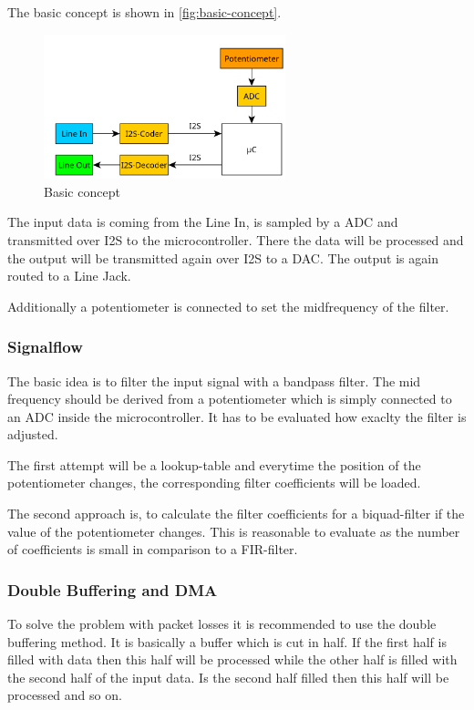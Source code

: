 The basic concept is shown in \autoref{fig:basic-concept}.

\begin{figure}[!h]
    \centering
    \includegraphics[width=7cm]{img/basic_concept.PNG}
    \caption{Basic concept}
    \label{fig:basic-concept}
\end{figure}

The input data is coming from the Line In, is sampled by a \ac{ADC} and transmitted
over \ac{I2S} to the microcontroller. There the data will be processed and the output will be transmitted
again over \ac{I2S} to a \ac{DAC}. The output is again routed to a Line Jack.

Additionally a potentiometer is connected to set the midfrequency of the filter.

\subsubsection{Signalflow}

The basic idea is to filter the input signal with a bandpass filter. The mid frequency should be derived
from a potentiometer which is simply connected to an \ac{ADC} inside the microcontroller. It has to be evaluated
how exaclty the filter is adjusted.

The first attempt will be a lookup-table and everytime the position of the
potentiometer changes, the corresponding filter coefficients will be loaded.

The second approach is, to calculate the filter coefficients for a biquad-filter if the value of the potentiometer changes.
This is reasonable to evaluate as the number of coefficients is small in comparison to a \ac{FIR}-filter.

\subsubsection{Double Buffering and DMA}

To solve the problem with packet losses it is recommended to use the double buffering method.
It is basically a buffer which is cut in half. If the first half is filled with data then this half
will be processed while the other half is filled with the second half of the input data. Is the second
half filled then this half will be processed and so on.

